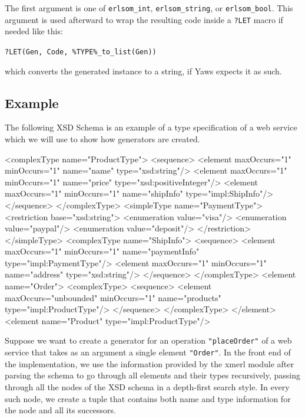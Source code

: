 \documentclass[copyright]{eptcs}
\newcommand{\LET}{\texttt{?LET}\xspace}
\begin{document}
The first argument is one of \texttt{erlsom\_int},
\texttt{erlsom\_string}, or \texttt{erlsom\_bool}. This argument is
used afterward to wrap the resulting code inside a \LET macro if
needed like this:

\begin{center}
  \texttt{?LET(Gen, Code, \%TYPE\%\_to\_list(Gen))}
\end{center}
which converts the generated instance to a string, if Yaws expects it as such.

\subsection{Example}

The following XSD Schema is an example of a type specification of a web service 
which we will use to show how generators are created.

\begin{lstxsd}
  <complexType name="ProductType">
    <sequence>
      <element maxOccurs="1" minOccurs="1" name="name" type="xsd:string"/>
      <element maxOccurs="1" minOccurs="1" name="price" type="xsd:positiveInteger"/>
      <element maxOccurs="1" minOccurs="1" name="shipInfo" type="impl:ShipInfo"/>
    </sequence>
  </complexType>
  <simpleType name="PaymentType">
    <restriction base="xsd:string">
      <enumeration value="visa"/>
      <enumeration value="paypal"/>
      <enumeration value="deposit"/>
    </restriction>
  </simpleType>
  <complexType name="ShipInfo">
    <sequence>
      <element maxOccurs="1" minOccurs="1" name="paymentInfo" type="impl:PaymentType"/>
      <element maxOccurs="1" minOccurs="1" name="address" type="xsd:string"/>
    </sequence>
  </complexType>
  <element name="Order">
    <complexType>
      <sequence>
        <element maxOccurs="unbounded" minOccurs="1" name="products" type="impl:ProductType"/>
      </sequence>
    </complexType>
  </element>
  <element name="Product" type="impl:ProductType"/>
\end{lstxsd}


Suppose we want to create a generator for an operation
\texttt{"placeOrder"} of a web service that takes as an argument a
single element \texttt{"Order"}. In the front end of the
implementation, we use the information provided by the xmerl module
after parsing the schema to go through all elements and their types
recursively, passing through all the nodes of the XSD schema in a
depth-first search style. In every such node, we create a tuple that
contains both name and type information for the node and all its
successors.
\end{document}
